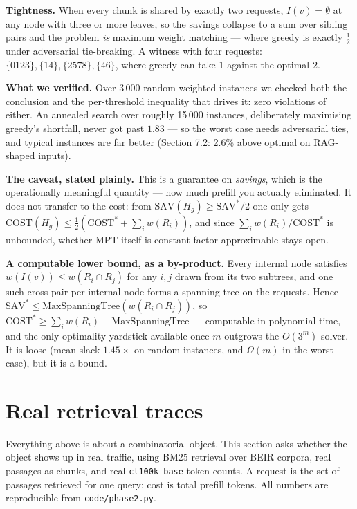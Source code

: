 \documentclass[11pt]{article}
\theoremstyle{plain}
\begin{document}
\textbf{Tightness.} When every chunk is shared by exactly two requests, $I(v) = \emptyset$ at any node with three or more leaves, so the savings collapse to a sum over sibling pairs and the problem \emph{is} maximum weight matching --- where greedy is exactly $\tfrac12$ under adversarial tie-breaking. A witness with four requests: $\{0123\},\{14\},\{2578\},\{46\}$, where greedy can take $1$ against the optimal $2$.

\textbf{What we verified.} Over 3\,000 random weighted instances we checked both the conclusion and the per-threshold inequality that drives it: zero violations of either. An annealed search over roughly 15\,000 instances, deliberately maximising greedy's shortfall, never got past $1.83$ --- so the worst case needs adversarial ties, and typical instances are far better (Section 7.2: 2.6\% above optimal on RAG-shaped inputs).

\textbf{The caveat, stated plainly.} This is a guarantee on \emph{savings}, which is the operationally meaningful quantity --- how much prefill you actually eliminated. It does not transfer to the cost: from $\mathrm{SAV}(H_g) \ge \mathrm{SAV}^*/2$ one only gets $\mathrm{COST}(H_g) \le \tfrac12(\mathrm{COST}^* + \sum_i w(R_i))$, and since $\sum_i w(R_i)/\mathrm{COST}^*$ is unbounded, whether MPT itself is constant-factor approximable stays open.

\textbf{A computable lower bound, as a by-product.} Every internal node satisfies $w(I(v)) \le w(R_i \cap R_j)$ for any $i,j$ drawn from its two subtrees, and one such cross pair per internal node forms a spanning tree on the requests. Hence $\mathrm{SAV}^* \le \mathrm{MaxSpanningTree}(w(R_i \cap R_j))$, so $\mathrm{COST}^* \ge \sum_i w(R_i) - \mathrm{MaxSpanningTree}$ --- computable in polynomial time, and the only optimality yardstick available once $m$ outgrows the $O(3^m)$ solver. It is loose (mean slack $1.45\times$ on random instances, and $\Omega(m)$ in the worst case), but it is a bound.


\section{Real retrieval traces}

Everything above is about a combinatorial object. This section asks whether the object shows up in real traffic, using BM25 retrieval over BEIR corpora, real passages as chunks, and real \texttt{cl100k\string\_base} token counts. A request is the set of passages retrieved for one query; cost is total prefill tokens. All numbers are reproducible from \texttt{code/phase2.py}.
\end{document}
